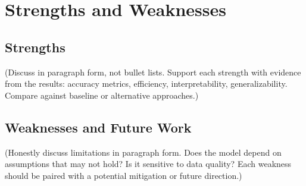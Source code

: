 \section{Strengths and Weaknesses}

\subsection{Strengths}

(Discuss in paragraph form, not bullet lists. Support each strength with
evidence from the results: accuracy metrics, efficiency, interpretability,
generalizability. Compare against baseline or alternative approaches.)

\subsection{Weaknesses and Future Work}

(Honestly discuss limitations in paragraph form. Does the model depend on
assumptions that may not hold? Is it sensitive to data quality? Each
weakness should be paired with a potential mitigation or future direction.)
